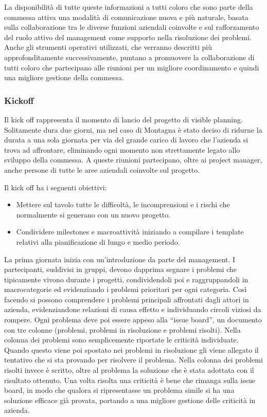 \begin{multicols}{2}
	La disponibilità di tutte queste informazioni a tutti coloro che sono parte della commessa attiva una modalità di comunicazione nuova e più naturale, basata sulla collaborazione tra le diverse funzioni aziendali coinvolte e sul rafforzamento del ruolo attivo del management come supporto nella risoluzione dei problemi.
	Anche gli strumenti operativi utilizzati, che verranno descritti più approfonditamente successivamente, puntano a promuovere la collaborazione di tutti coloro che partecipano alle riunioni per un migliore coordinamento e quindi una migliore gestione della commessa.

	\subsubsection{Kickoff}
	Il kick off rappresenta il momento di lancio del progetto di visible planning. Solitamente dura due giorni, ma nel caso di Montagna è stato deciso di ridurne la durata a una sola giornata per via del grande carico di lavoro che l’azienda si trova ad affrontare, eliminando ogni momento non strettamente legato allo sviluppo della commessa. A queste riunioni partecipano, oltre ai project manager, anche persone di tutte le aree aziendali coinvolte sul progetto.

	Il kick off ha i seguenti obiettivi:
	\begin{itemize}
		\item Mettere sul tavolo tutte le difficoltà, le incomprensioni e i rischi che normalmente si generano con un nuovo progetto.
		\item Condividere milestones e macroattività iniziando a compilare i template relativi alla pianificazione di lungo e medio periodo.
	\end{itemize}

	La prima giornata inizia con un’introduzione da parte del management. I partecipanti, suddivisi in gruppi, devono dapprima segnare i problemi che tipicamente vivono durante i progetti, condividendoli poi e raggruppandoli in macrocategorie ed evidenziando i problemi prioritari per ogni categoria. Così facendo si possono comprendere i problemi principali affrontati dagli attori in azienda, evidenziandone relazioni di causa effetto e individuando circoli viziosi da rompere. Ogni problema deve poi essere appeso alla “issue board”, un documento con tre colonne (problemi, problemi in risoluzione e problemi risolti). Nella colonna dei problemi sono semplicemente riportate le criticità individuate. Quando questo viene poi spostato nei problemi in risoluzione gli viene allegato il tentativo che si sta provando per risolvere il problema. Nella colonna dei problemi risolti invece è scritto, oltre al problema la soluzione che è stata adottata con il risultato ottenuto. Una volta risolta una criticità è bene che rimanga sulla issue board, in modo che qualora si ripresentasse un problema simile si ha una soluzione efficace già provata, portando a una migliore gestione delle criticità in azienda.


\end{multicols}
